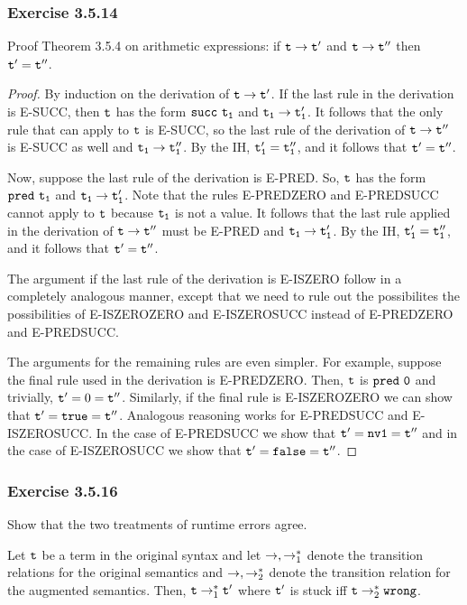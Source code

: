 \subsubsection*{Exercise 3.5.14}
Proof Theorem 3.5.4 on arithmetic expressions: if $\sstep{\term{t}}{\term{t'}}$ and $\sstep{\term{t}}{\term{t''}}$ then $\term{t'} = \term{t''}$.
\begin{proof}
    By induction on the derivation of $\sstep{\term{t}}{\term{t'}}$.  If the last rule in the derivation
    is E-SUCC, then $\term{t}$ has the form $\suc{\term{t_1}}$ and $\sstep{\term{t_1}}{\term{t_1'}}$.
    It follows that the only rule
    that can apply to $\term{t}$ is E-SUCC, so the last rule of the derivation of 
    $\sstep{\term{t}}{\term{t''}}$ is E-SUCC as well and $\sstep{\term{t_1}}{\term{t_1''}}$.
    By the IH, $\term{t_1'} = \term{t_1''}$, and it follows that $\term{t'} = \term{t''}$.

    Now, suppose the last rule of the derivation is E-PRED.  So, $\term{t}$ has the form
    $\pred{\term{t_1}}$ and $\sstep{\term{t_1}}{\term{t_1'}}$.  Note that the rules E-PREDZERO
    and E-PREDSUCC cannot apply to $\term{t}$ because $\term{t_1}$ is not a value.  It follows
    that the last rule applied in the derivation of $\sstep{\term{t}}{\term{t''}}$ must be 
    E-PRED and $\sstep{\term{t_1}}{\term{t_1'}}$.  
    By the IH, $\term{t_1'} = \term{t_1''}$, and it follows that $\term{t'} = \term{t''}$.

    The argument if the last rule of the derivation is E-ISZERO follow in a completely analogous manner,
    except that we need to rule out the possibilites the possibilities of E-ISZEROZERO and
    E-ISZEROSUCC instead of E-PREDZERO and E-PREDSUCC.

    The arguments for the remaining rules are even simpler.  For example, suppose the final rule 
    used in the derivation is E-PREDZERO.  Then, $\term{t}$ is  $\pred{0}$ and trivially, 
    $\term{t'} = 0 = \term{t''}$. Similarly, if the final rule is E-ISZEROZERO we can show
    that $\term{t'} = \true = \term{t''}$.  Analogous reasoning works for E-PREDSUCC and E-ISZEROSUCC.
    In the case of E-PREDSUCC we show that $\term{t'} = \term{nv1} = \term{t''}$ and in the case of
    E-ISZEROSUCC we show that $\term{t'} = \false = \term{t''}$.
\end{proof}

\subsubsection*{Exercise 3.5.16}
Show that the two treatments of runtime errors agree.
\begin{claim}
    Let $\term{t}$ be a term in the original syntax and let $\sarr_1, \marr_1$ 
    denote the transition relations for the original
    semantics and $\sarr_2, \marr_2$ denote the transition relation for the augmented semantics.  
    Then, $\term{t} \marr_1 \term{t'}$ where $\term{t'}$ is stuck iff $\term{t} \marr_2 \wrong$.
\end{claim}

